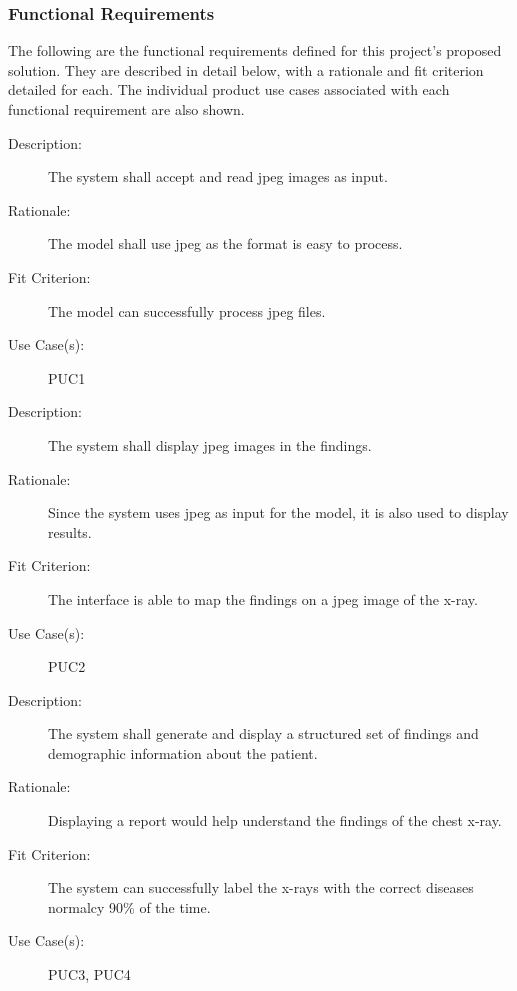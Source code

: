 \documentclass[12pt]{article}
\begin{document}
\subsubsection{Functional Requirements}
The following are the functional requirements defined for this project's proposed solution. They are described in detail below, with a rationale and fit criterion detailed for each. The individual product use cases associated with each functional requirement are also shown.
\begin{enumerate}[label=FR\arabic*., series=frs]
    \begin{item}
        \begin{description}
            \item[Description:] The system shall accept and read jpeg images as input.
            \item[Rationale:] The model shall use jpeg as the format is easy to process.
            \item[Fit Criterion:] The model can successfully process jpeg files.
            \item[Use Case(s):] PUC1
        \end{description}
    \end{item}
    \begin{item}
        \begin{description}
            \item[Description:] The system shall display jpeg images in the findings.
            \item[Rationale:] Since the system uses jpeg as input for the model, it is also used to display results.
            \item[Fit Criterion:] The interface is able to map the findings on a jpeg image of the x-ray.
            \item[Use Case(s):] PUC2
        \end{description}
    \end{item}
    \begin{item}
        \begin{description}
            \item[Description:] The system shall generate and display a structured set of findings and demographic information about the patient.
            \item[Rationale:] Displaying a report would help understand the findings of the chest x-ray.
            \item[Fit Criterion:] The system can successfully label the x-rays with the correct diseases normalcy 90\% of the time.
            \item[Use Case(s):] PUC3, PUC4
        \end{description}
    \end{item}
    \begin{item}
        \begin{description}
            

\end{description}
\end{item}
\end{enumerate}
\end{document}
